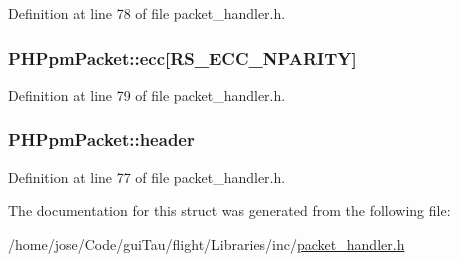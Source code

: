 Definition at line 78 of file packet\-\_\-handler.\-h.

\hypertarget{struct_p_h_ppm_packet_a4cd9aaabbc588410a6ccc2d333fc224a}{
\subsubsection[{ecc}]{ P\-H\-Ppm\-Packet\-::ecc\mbox{[}R\-S\-\_\-\-E\-C\-C\-\_\-\-N\-P\-A\-R\-I\-T\-Y\mbox{]}}}\label{struct_p_h_ppm_packet_a4cd9aaabbc588410a6ccc2d333fc224a}


Definition at line 79 of file packet\-\_\-handler.\-h.

\hypertarget{struct_p_h_ppm_packet_a6dbe9e28bb634aadd35b5c4501589532}{
\subsubsection[{header}]{ P\-H\-Ppm\-Packet\-::header}}\label{struct_p_h_ppm_packet_a6dbe9e28bb634aadd35b5c4501589532}


Definition at line 77 of file packet\-\_\-handler.\-h.



The documentation for this struct was generated from the following file\-:\begin{DoxyCompactItemize}
\item 
/home/jose/\-Code/gui\-Tau/flight/\-Libraries/inc/\hyperlink{packet__handler_8h}{packet\-\_\-handler.\-h}\end{DoxyCompactItemize}
